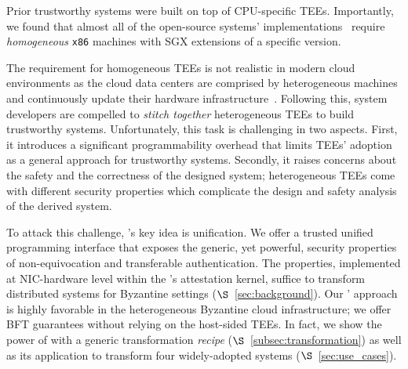 
 Prior trustworthy systems were built on top of CPU-specific TEEs. Importantly, we found that almost all of the open-source systems' implementations~\cite{hybster, 10.1145/3492321.3519568, minBFT, DBLP:journals/corr/LiuLKA16a} require {\em homogeneous} {\tt x86} machines with SGX extensions of a specific version.

The requirement for homogeneous TEEs is not realistic in modern cloud environments as the cloud data centers are comprised by heterogeneous machines and continuously update their hardware infrastructure~\cite{}. Following this, system developers are compelled to {\em stitch together} heterogeneous TEEs to build trustworthy systems. Unfortunately, this task is challenging in two aspects. First, it introduces a significant programmability overhead that limits TEEs' adoption as a general approach for trustworthy systems. Secondly, it raises concerns about the safety and the correctness of the designed system; heterogeneous TEEs come with different security properties which complicate the design and safety analysis of the derived system.


 To attack this challenge, \projecttitle{}'s key idea is unification. We offer a trusted unified programming interface that exposes the generic, yet powerful, security properties of non-equivocation and transferable authentication. The properties, implemented at NIC-hardware level within the \projecttitle{}'s attestation kernel, suffice to transform distributed systems for Byzantine settings ($\S$~\ref{sec:background}). Our \projecttitle{}' approach is highly favorable in the heterogeneous Byzantine cloud infrastructure; we offer BFT guarantees without relying on the host-sided TEEs. In fact, we show the power of \projecttitle{} with a generic transformation {\em recipe} ($\S$~\ref{subsec:transformation}) as well as its application to transform four widely-adopted systems ($\S$~\ref{sec:use_cases}).

